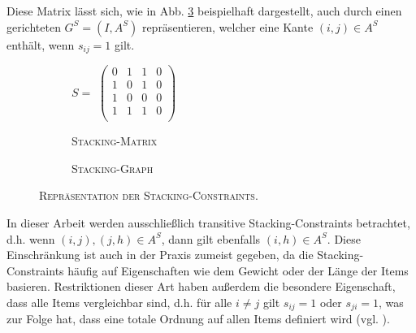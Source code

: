 Diese Matrix lässt sich, wie in Abb. \ref{fig:matrix_to_graph} beispielhaft dargestellt, auch durch einen
gerichteten  $G^S = (I, A^S)$ repräsentieren, welcher eine Kante $(i, j) \in A^S$ enthält,
wenn $s_{ij} = 1$ gilt.
\begin{figure}[H]
  \begin{subfigure}[b]{0.5\textwidth}
  \centering
    $S =$
    $\left(
    \begin{array}{rrrr}
    0 & 1 & 1 & 0 \\
    1 & 0 & 1 & 0 \\
    1 & 0 & 0 & 0 \\
    1 & 1 & 1 & 0 \\
    \end{array} \right) $
    \caption{\textsc{Stacking-Matrix}}
    \label{fig:constraint_matrix}
  \end{subfigure}
  \hfill
  \begin{subfigure}[b]{0.5\textwidth}
  \centering
    \caption{\textsc{Stacking-Graph}}
    \label{fig:resulting_graph}
  \end{subfigure}
  \caption{\textsc{Repräsentation der Stacking-Constraints.}}
  \label{fig:matrix_to_graph}
\end{figure}
In dieser Arbeit werden ausschließlich transitive Stacking-Constraints betrachtet, d.h.
wenn $(i, j), (j, h) \in A^S$, dann gilt ebenfalls $(i, h) \in A^S$.
Diese Einschränkung ist auch in der Praxis zumeist gegeben, da die Stacking-Constraints häufig auf Eigenschaften wie dem Gewicht oder der Länge der Items basieren. Restriktionen dieser Art haben außerdem die besondere Eigenschaft, dass alle Items vergleichbar sind, d.h. für alle $i \neq j$ gilt $s_{ij} = 1$ oder $s_{ji} = 1$, was zur Folge hat,
dass eine totale Ordnung auf allen Items definiert wird (vgl. \citet{Bruns2015}).

